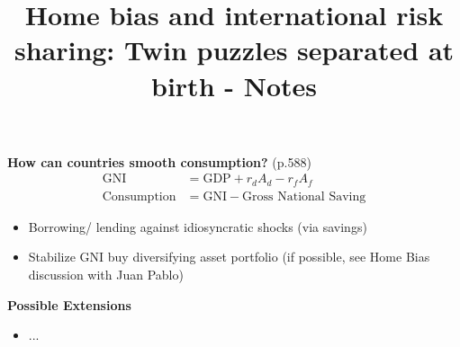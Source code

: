 \documentclass{scrarticle}
\begin{document}
\title{Home bias and international risk sharing:
Twin puzzles separated at birth - Notes}
\maketitle

\noindent \textbf{How can countries smooth consumption?} (p.588)\\
\begin{align}
    \mathrm{GNI} &= \mathrm{GDP} + r_dA_d - r_fA_f \\
    \text{Consumption} &= \mathrm{GNI} - \text{Gross National Saving}
\end{align}
\begin{itemize}
    \item Borrowing/ lending against idiosyncratic shocks (via savings)
    \item Stabilize GNI buy diversifying asset portfolio (if possible, see Home Bias discussion with Juan Pablo)
\end{itemize}


\noindent \textbf{Possible Extensions}
\begin{itemize}
    \item ...
\end{itemize}
\end{document}
